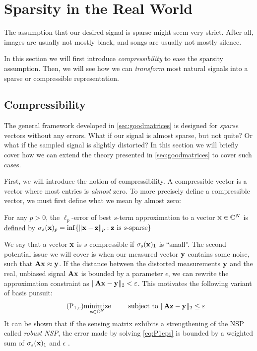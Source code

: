 






\section{Sparsity in the Real World}
The assumption that our desired signal is sparse might seem very strict. After all, images are usually not mostly black, and songs are usually not mostly silence.

In this section we will first introduce \textit{compressi\-bility} to ease the sparsity assumption. Then, we will see how we can \textit{transform} most natural signals into a sparse or compressible representation.


\subsection{Compressibility}
The general framework developed in \cref{sec:goodmatrices} is designed for \textit{sparse} vectors without any errors. What if our signal is almost sparse, but not quite? Or what if the sampled signal is slightly distorted? In this section we will briefly cover how we can extend the theory presented in \cref{sec:goodmatrices} to cover such cases.

First, we will introduce the notion of compressibility.
A compressible vector is a vector where most entries is \textit{almost} zero. To more precisely define a compressible vector, we must first define what we mean by almost zero:
\begin{definition} \label{def:compressibility}
	For any $ p > 0 $, the $ \ell_{p} $-error of best $ s $-term approximation to a vector $ \mathbf{x} \in \mathbb{C}^{N} $ is defined by
	\(
		\sigma_{s}(\mathbf{x})_{p} = \inf \{\lVert\mathbf{x} - \mathbf{z}\rVert_{p} : \mathbf{z} \text{ is } s\text{-sparse}\}
	\)
\end{definition}

We say that a vector $ \mathbf{x} $ is $ s $-compressible if $ \sigma_{s}(\mathbf{x})_{1} $ is ``small''. The second potential issue we will cover is when our measured vector $ \mathbf{y} $ contains some noise, such that $ \mathbf{A}\mathbf{x} \approx \mathbf{y} $. If the distance between the distorted measurements $ \mathbf{y} $ and the real, unbiased signal $ \mathbf{A}\mathbf{x} $ is bounded by a parameter $ \epsilon $, we can rewrite the approximation constraint as $ \lVert\mathbf{A}\mathbf{x} - \mathbf{y}\rVert_{2} < \varepsilon $. This motivates the following variant of basis pursuit:
\begin{equation}
	\tag{P$_{1, \epsilon}$}
	\label{eq:P1eps}
	\minimize{\z\in\Cx^{N}} \quad\subjectto \norm{\A\z - \y}_{2} \leq \epsilon
\end{equation}
It can be shown that if the sensing matrix exhibits a strengthening of the NSP called \textit{robust NSP}, the error made by solving \eqref{eq:P1eps} is bounded by a weighted sum of $ \sigma_{s}(\mathbf{x})_{1} $ and $ \epsilon $ \cite[Section~4.3]{foucart13intro}.


